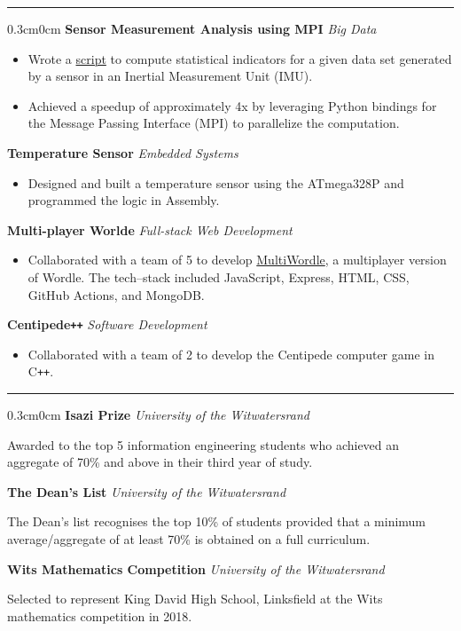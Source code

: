 \documentclass[10pt, a4paper]{article}
\newcommand{\location}[1]{\textit{#1}}
\newcommand{\contentType}[1]{\textit{#1}}
\newcommand{\heading}[1]{
\makebox[0pt][l]{\Large \sc \hspace{2pt}#1}
\rule[-0.7ex]{\columnwidth}{0.5pt}\vspace{1.0ex}
}
\newcommand{\subheading}[1]{{\bfseries #1}}
\newcommand{\subheadSkip}{\vspace{0.7ex}}
\newenvironment{mysection}[1]
{\vspace{2.5ex}
\heading{#1}
\begin{adjustwidth}{0.3cm}{0cm}}
{\end{adjustwidth} }
\begin{document}
\begin{mysection}{Projects}
 \subheadSkip
 \subheading{Sensor Measurement Analysis using MPI} \hfill \contentType{Big Data}
\begin{itemize}
    \item Wrote a \href{https://github.com/RyanSelesnik/Big-data-project}{script} to compute statistical indicators for a given data set generated by a sensor in an Inertial Measurement Unit (IMU).
    \item Achieved a speedup of approximately 4x by leveraging Python bindings for the Message Passing Interface (MPI) to parallelize the computation.
\end{itemize}
 \subheadSkip
 \subheading{Temperature Sensor} \hfill \contentType{Embedded Systems}
\begin{itemize}
    \item Designed and built a temperature sensor using the ATmega328P and programmed the logic in Assembly.
\end{itemize}
 \subheadSkip
 \subheading{Multi-player Worlde} \hfill \contentType{Full-stack Web Development}
\begin{itemize}
    \item Collaborated with a team of 5 to develop \href{https://github.com/witseie-elen4010/2022-group-lab-001}{MultiWordle}, a multiplayer version of Wordle. The tech--stack included JavaScript, Express, HTML, CSS, GitHub Actions, and MongoDB. 
\end{itemize}
 \subheadSkip

 \subheading{Centipede\texttt{++}} \hfill \contentType{Software Development}
\begin{itemize}
    \item Collaborated with a team of 2 to develop the Centipede computer game in C\texttt{++}.
\end{itemize}


\end{mysection}

\begin{mysection}{Honours and Awards}
\subheadSkip
\subheading{Isazi Prize} \hfill \location{University of the Witwatersrand}


\hspace{1em} Awarded to the top 5 information engineering students who achieved an aggregate of 70\% and above in their third year of study.

\subheadSkip
\subheading{The Dean's List} \hfill \location{University of the Witwatersrand}

\hspace{1em} The Dean's list recognises the top 10\% of students provided that a minimum average/aggregate of at least 70\% is obtained on a full curriculum.

\subheadSkip
\subheading{Wits Mathematics Competition} \hfill \location{University of the Witwatersrand}

\hspace{1em} Selected to represent King David High School, Linksfield  at the Wits mathematics competition in 2018. 

\end{mysection}
\end{document}
